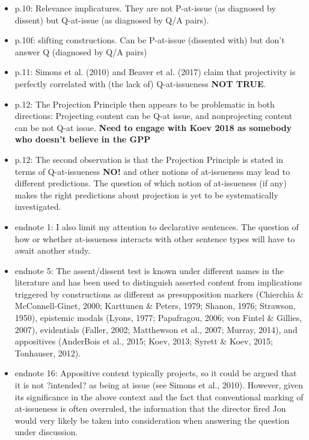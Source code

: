 \documentclass[11pt,fleqn]{article}
\newcommand{\6}{\mbox{$[\hspace*{-.6mm}[$}}
\newcommand{\9}{\mbox{$]\hspace*{-.6mm}]$}}
\begin{document}
\begin{itemize}
\begin{itemize}
\begin{itemize}
\item p.10: Relevance implicatures. They are not P-at-issue (as diagnosed by dissent) but Q-at-issue (as diagnosed by Q/A pairs).

\item p.10f: slifting constructions. Can be P-at-issue (dissented with) but don't answer Q (diagnosed by Q/A pairs)

\item p.11:  Simons et al. (2010) and Beaver et al. (2017) claim that projectivity is perfectly correlated with (the lack of) Q-at-issueness {\bf NOT TRUE}.

\item p.12: The Projection Principle then appears to be problematic in both directions: Projecting content can be Q-at issue, and nonprojecting content can be not Q-at issue.  {\bf Need to engage with Koev 2018 as somebody who doesn't believe in the GPP}

\item p.12: The second observation is that the Projection Principle is stated in terms of Q-at-issueness {\bf NO!} and other notions of at-issueness may lead to different predictions. The question of which notion of at-issueness (if any) makes the right predictions about projection is yet to be systematically investigated.

\item endnote 1: I also limit my attention to declarative sentences. The question of how or whether at-issueness interacts with other sentence types will have to await another study.

\item endnote 5: The assent/dissent test is known under different names in the literature and has been used to distinguish asserted content from implications triggered by constructions as different as presupposition markers (Chierchia \& McConnell-Ginet, 2000; Karttunen \& Peters, 1979; Shanon, 1976; Strawson, 1950), epistemic modals (Lyons, 1977; Papafragou, 2006; von Fintel \& Gillies, 2007), evidentials (Faller, 2002; Matthewson et al., 2007; Murray, 2014), and appositives (AnderBois et al., 2015; Koev, 2013; Syrett \& Koev, 2015; Tonhauser, 2012).

\item endnote 16: Appositive content typically projects, so it could be argued that it is not ?intended? as being at issue (see Simons et al., 2010).
However, given its significance in the above context and the fact that conventional marking of at-issueness is often overruled, the information that the director fired Jon would very likely be taken into consideration when answering the question under discussion.



\end{itemize}
\end{itemize}
\end{itemize}
\end{document}
